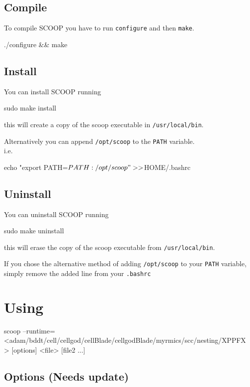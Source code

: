 \documentclass[
a4paper,
12pt,
]{article}
\begin{document}
\subsection{Compile}
To compile SCOOP you have to run \verb!configure! and then \verb!make!.
\begin{bash}
  ./configure && make
\end{bash}

\subsection{Install}
You can install SCOOP running
\begin{bash}
  sudo make install
\end{bash}
this will create a copy of the scoop executable in
\verb!/usr/local/bin!.

Alternatively you can append \verb!/opt/scoop! to the \verb!PATH!
variable.\\
i.e.
\begin{bash}
  echo "export PATH=$PATH:/opt/scoop" >> $HOME/.bashrc
\end{bash}

\subsection{Uninstall}

You can uninstall SCOOP running
\begin{bash}
  sudo make uninstall
\end{bash}
this will erase the copy of the scoop executable from
\verb!/usr/local/bin!.

If you chose the alternative method of adding \verb!/opt/scoop! to
your \verb!PATH! variable, simply remove the added line from your \verb!.bashrc!

\section{Using}

\begin{bash}
  scoop --runtime=<adam/bddt/cell/cellgod/cellBlade/cellgodBlade/myrmics/scc/nesting/XPPFX> [options] <file> [file2 ...]
\end{bash}

\subsection{Options (Needs update)}
\end{document}

